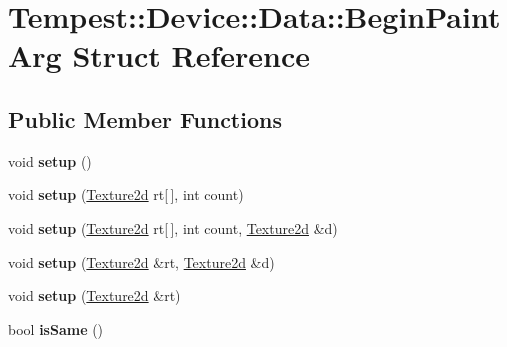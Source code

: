 \hypertarget{struct_device_1_1_data_1_1_begin_paint_arg}{\section{Tempest\+:\+:Device\+:\+:Data\+:\+:Begin\+Paint\+Arg Struct Reference}
\label{struct_device_1_1_data_1_1_begin_paint_arg}
}
\subsection*{Public Member Functions}
\begin{DoxyCompactItemize}
\item 
\hypertarget{struct_device_1_1_data_1_1_begin_paint_arg_a13735aa75bc8c13e64504b51375457c4}{void {\bfseries setup} ()}\label{struct_device_1_1_data_1_1_begin_paint_arg_a13735aa75bc8c13e64504b51375457c4}

\item 
\hypertarget{struct_device_1_1_data_1_1_begin_paint_arg_a6b94b25f73d871dc87abc68912d47d8f}{void {\bfseries setup} (\hyperlink{class_tempest_1_1_texture2d}{Texture2d} rt\mbox{[}$\,$\mbox{]}, int count)}\label{struct_device_1_1_data_1_1_begin_paint_arg_a6b94b25f73d871dc87abc68912d47d8f}

\item 
\hypertarget{struct_device_1_1_data_1_1_begin_paint_arg_a0d989e3be66ec70fbea46ac0e819dc8c}{void {\bfseries setup} (\hyperlink{class_tempest_1_1_texture2d}{Texture2d} rt\mbox{[}$\,$\mbox{]}, int count, \hyperlink{class_tempest_1_1_texture2d}{Texture2d} \&d)}\label{struct_device_1_1_data_1_1_begin_paint_arg_a0d989e3be66ec70fbea46ac0e819dc8c}

\item 
\hypertarget{struct_device_1_1_data_1_1_begin_paint_arg_a67b19b6e61640a0f22971071668caf89}{void {\bfseries setup} (\hyperlink{class_tempest_1_1_texture2d}{Texture2d} \&rt, \hyperlink{class_tempest_1_1_texture2d}{Texture2d} \&d)}\label{struct_device_1_1_data_1_1_begin_paint_arg_a67b19b6e61640a0f22971071668caf89}

\item 
\hypertarget{struct_device_1_1_data_1_1_begin_paint_arg_ac04ab18a1394dbc2d741abbb142adaf9}{void {\bfseries setup} (\hyperlink{class_tempest_1_1_texture2d}{Texture2d} \&rt)}\label{struct_device_1_1_data_1_1_begin_paint_arg_ac04ab18a1394dbc2d741abbb142adaf9}

\item 
\hypertarget{struct_device_1_1_data_1_1_begin_paint_arg_acab13f23ae694c83cd17d1bc8df62796}{bool {\bfseries is\+Same} ()}\label{struct_device_1_1_data_1_1_begin_paint_arg_acab13f23ae694c83cd17d1bc8df62796}


\end{DoxyCompactItemize}
